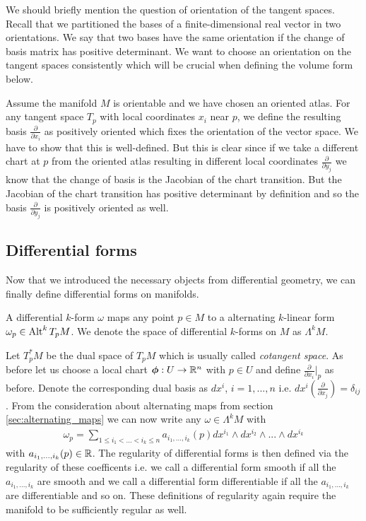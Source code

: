 \documentclass[../main.tex]{subfiles}
\begin{document}
We should briefly mention the question of orientation of the tangent spaces.
Recall that we partitioned the bases of a finite-dimensional real vector 
in two orientations. We say that two bases have the same 
orientation if the change of basis matrix has positive determinant.
We want to choose an orientation on the tangent spaces consistently which 
will be crucial when defining the volume form below.

Assume the manifold $M$ is orientable and we have chosen an oriented atlas.
For any tangent space $T_p$ with local coordinates $x_i$ near $p$, 
we define the resulting basis $\frac{\partial}{\partial x_i}$ as positively
oriented which fixes the orientation of the vector space. We have to show 
that this is well-defined. But this is clear since if we take a different 
chart at $p$ from the oriented atlas resulting in different local coordinates 
$\frac{\partial}{\partial y_j}$
we know that the change of 
basis is the Jacobian of the chart transition. But the Jacobian of the 
chart transition has positive determinant by definition and so the basis 
$\frac{\partial}{\partial y_j}$ is positively oriented as well.

\subsection{Differential forms}\label{sec:differential_forms_subsection}
Now that we introduced the necessary objects from differential geometry, 
we can finally define differential forms on manifolds.

\begin{definition}
    A differential $k$-form $\omega$ maps any point $p \in M$ to a 
    alternating $k$-linear form $\omega_p \in {\text{Alt}^{k}\,T_p M}$.
    We denote the space of differential $k$-forms on $M$ as $\Lambda^k M$.
\end{definition}

Let $T_p^* M$ be the dual space of $T_p M$ which is usually called 
\textit{cotangent space}.
As before let us choose a local chart $\boldsymbol{\phi}: U \rightarrow \mathbb{R}^n$ with 
$p \in U$ and define $\frac{\partial}{\partial x_i}|_p$ as before. 
Denote the corresponding
dual basis as $dx^i$, $i = 1,...,n$ i.e. 
$dx^i(\frac{\partial}{\partial x_j}) = \delta_{ij}$. 
From the consideration about
alternating maps from section \ref{sec:alternating_maps} we can now write any 
$\omega \in \Lambda^k M$ with 
\begin{align*}
    \omega_p = \sum\limits_{1\leq i_1 < ... < i_k \leq n} 
        a_{i_1,...,i_k}(p) dx^{i_1} \wedge dx^{i_2} \wedge ... \wedge dx^{i_k}
\end{align*}
with $a_{i_1,...,i_k}(p) \in \mathbb{R}$. The regularity of differential forms 
is then defined via the regularity of these coefficents i.e. we call 
a differential form smooth if all the $a_{i_1,...,i_k}$ are smooth 
and we call a differential form differentiable if all the $a_{i_1,...,i_k}$
are differentiable and so on. These definitions of regularity again require 
the manifold to be sufficiently regular as well.
\end{document}
